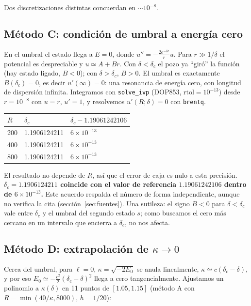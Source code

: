\documentclass[11pt]{article}
\newcommand{\dc}{\delta_c}
\begin{document}
Dos discretizaciones distintas concuerdan en $\sim10^{-8}$.

\subsection{Método C: condición de umbral a energía cero}

En el umbral el estado llega a $E=0$, donde $u''=-\frac{2e^{-\delta r}}{r}u$. Para $r\gg1/\delta$ el potencial es despreciable y $u\simeq A+Br$. Con $\delta<\dc$ el pozo ya ``giró'' la función (hay estado ligado, $B<0$); con $\delta>\dc$, $B>0$. El umbral es exactamente $B(\dc)=0$, es decir $u'(\infty)=0$: una resonancia de energía cero, con longitud de dispersión infinita. Integramos con \texttt{solve\_ivp} (DOP853, $\text{rtol}=10^{-13}$) desde $r=10^{-8}$ con $u=r$, $u'=1$, y resolvemos $u'(R;\delta)=0$ con \texttt{brentq}.

\begin{table}[H]
\centering
\small
\begin{tabular}{@{}lll@{}}
\toprule
$R$ & $\dc$ & $\dc-1.19061242106$\\
\midrule
200 & 1.1906124211 & $6\times10^{-13}$\\
400 & 1.1906124211 & $6\times10^{-13}$\\
800 & 1.1906124211 & $6\times10^{-13}$\\
\bottomrule
\end{tabular}
\end{table}

El resultado no depende de $R$, así que el error de caja es nulo a esta precisión. \textbf{$\dc=1.1906124211$ coincide con el valor de referencia $1.19061242106$ dentro de $6\times10^{-13}$.} Este acuerdo respalda el número de forma independiente, aunque no verifica la cita (sección~\ref{sec:fuentes}). Una sutileza: el signo $B<0$ para $\delta<\dc$ vale entre $\dc$ y el umbral del segundo estado $s$; como buscamos el cero más cercano en un intervalo que encierra a $\dc$, no nos afecta.

\subsection{Método D: extrapolación de $\kappa\to0$}

Cerca del umbral, para $\ell=0$, $\kappa=\sqrt{-2E_0}$ se anula linealmente, $\kappa\simeq c(\dc-\delta)$, y por eso $E_0\simeq-\tfrac{c^2}{2}(\dc-\delta)^2$ llega a cero tangencialmente. Ajustamos un polinomio a $\kappa(\delta)$ en 11 puntos de $[1.05,1.15]$ (método A con $R=\min(40/\kappa,8000)$, $h=1/20$):
\end{document}
